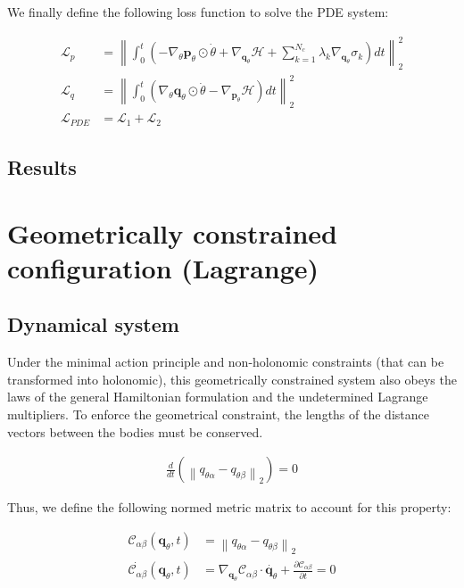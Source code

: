 \documentclass[draft]{agujournal2019}
\newcommand{\norm}[1]{\left\lVert#1\right\rVert}
\begin{document}
We finally define the following loss function to solve the PDE system:

\begin{align}
    \mathcal{L}_{p} &= \norm{\int_0^t \left(- \nabla_\theta \mathbf{p}_\theta \odot \dot{\theta} + \nabla_{\mathbf{q}_\theta} \mathcal{H} + \sum_{k = 1}^{N_c} \lambda_k \nabla_{\mathbf{q}_\theta} \sigma_k\right) dt}_2^2 \\
    \mathcal{L}_{q} &= \norm{\int_0^t \left(\nabla_\theta \mathbf{q}_\theta \odot \dot{\theta} - \nabla_{\mathbf{p}_\theta} \mathcal{H}\right) dt}^2_2 \\
    \mathcal{L}_{PDE} &= \mathcal{L}_1 + \mathcal{L}_2
\end{align}

\subsection{Results}
\section{Geometrically constrained configuration (Lagrange)}
\subsection{Dynamical system}
Under the minimal action principle and non-holonomic constraints (that can be transformed into holonomic), this geometrically constrained system also obeys the laws of the general Hamiltonian formulation and the undetermined Lagrange multipliers. To enforce the geometrical constraint, the lengths of the distance vectors between the bodies must be conserved.

\begin{align*}
    \frac{d}{dt} \left( \norm{q_{\theta\alpha} - q_{\theta\beta}}_2\right) = 0
\end{align*}

Thus, we define the following normed metric matrix to account for this property:

\begin{align*}
    \mathcal{C}_{\alpha\beta}(\mathbf{q}_\theta, t) &= \norm{q_{\theta\alpha} - q_{\theta\beta}}_2 \\
    \dot{\mathcal{C}_{\alpha\beta}}\left(\mathbf{q}_\theta, t\right) &= \nabla_{\mathbf{q}_\theta} \mathcal{C}_{\alpha\beta} \cdot \dot{\mathbf{q}_\theta} + \frac{\partial \mathcal{C}_{\alpha\beta}}{\partial t} = 0
\end{align*}
\end{document}
